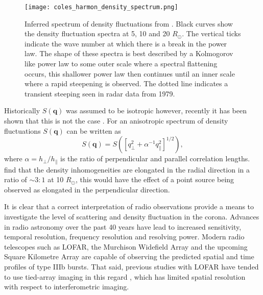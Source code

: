 \begin{figure}
	\centering
	\texttt{[image: coles\_harmon\_density\_spectrum.png]}
	\caption[Inferred spectrum of density fluctuations from \cite{Coles1989}]{Inferred spectrum of density fluctuations from \cite{Coles1989}. Black curves show the density fluctuation spectra at 5, 10 and 20 $R_\odot$. The vertical ticks indicate the wave number at which there is a break in the power law. The shape of these spectra is best described by a Kolmogorov like power law to some outer scale where a spectral flattening occurs, this shallower power law then continues until an inner scale where a rapid steepening is observed. The dotted line indicates a transient steeping seen in radar data from 1979.}
	\label{fig:CH_density_spectrum}
\end{figure}

Historically $S(\mathbf{q})$ was assumed to be isotropic however, recently it has been shown that this is not the case \citep{Kontar2019}. For an anisotropic spectrum of density fluctuations $S(\mathbf{q})$ can be written as 
\begin{equation}
S(\mathbf{q}) = S\left(\left[q_\perp^2 + \alpha^{-1}q_\parallel^2\right]^{1/2}\right),
\end{equation}
where $\alpha = h_\perp / h_\parallel$ is the ratio of perpendicular and parallel correlation lengths. \cite{Armstrong1990} find that the density inhomogeneities are elongated in the radial direction in a ratio of $\sim 3:1$ at 10 $R_\odot$, this would have the effect of a point source being observed as elongated in the perpendicular direction.

It is clear that a correct interpretation of radio observations provide a means to investigate the level of scattering and density fluctuation in the corona. Advances in radio astronomy over the past 40 years have lead to increased sensitivity, temporal resolution, frequency resolution and resolving power. Modern radio telescopes such as LOFAR, the Murchison Widefield Array \citep[MWA;][]{Lonsdale2009} and the upcoming Square Kilometre Array \citep[SKA;][]{Dewdney2009} are capable of observing the predicted spatial and time profiles of type IIIb bursts. That said, previous studies with LOFAR have tended to use tied-array imaging in this regard \citep{Kontar2017}, which has limited spatial resolution with respect to interferometric imaging.


